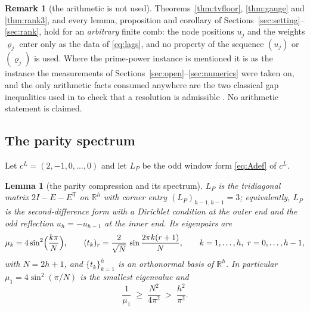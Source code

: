 \documentclass[11pt,a4paper]{article}
\theoremstyle{plain}
\newtheorem{lemma}[theorem]{Lemma}
\theoremstyle{definition}
\newtheorem{remark}[theorem]{Remark}
\newcommand{\R}{\mathbb{R}}
\newcommand{\T}{\mathsf{T}}
\begin{document}
\begin{remark}[the arithmetic is not used]
\label{rem:combfree}
Theorems~\ref{thm:tvfloor}, \ref{thm:gauge} and \ref{thm:rank3}, and every
lemma, proposition and corollary of Sections~\ref{sec:setting}--\ref{sec:rank},
hold for an \emph{arbitrary} finite comb: the node positions $u_j$ and the
weights $\varrho_j$ enter only as the data of \eqref{eq:lags}, and no property of
the sequence $(u_j)$ or $(\varrho_j)$ is used. Where the prime-power instance is
mentioned it is as the instance the measurements of
Sections~\ref{sec:open}--\ref{sec:numerics} were taken on, and the only
arithmetic facts consumed anywhere are the two classical gap inequalities used
in \cite{PaperI} to check that a resolution is admissible
\cite{Chebyshev1852,RosserSchoenfeld1962}. No arithmetic statement is claimed.
\end{remark}

\subsection{The parity spectrum}
\label{sec:parity}

Let $c^{L}=(2,-1,0,\dots,0)$ and let $L_P$ be the odd window form
\eqref{eq:Adef} of $c^{L}$.

\begin{lemma}[the parity compression and its spectrum]
\label{lem:kms}
$L_P$ is the tridiagonal matrix $2I-E-E^{\T}$ on $\R^{h}$ with corner entry
$(L_P)_{h-1,h-1}=3$; equivalently, $L_P$ is the second-difference form with a
Dirichlet condition at the outer end and the odd reflection $u_h=-u_{h-1}$ at
the inner end. Its eigenpairs are
\begin{equation}
\label{eq:kms}
  \mu_k=4\sin^{2}\Bigl(\frac{k\pi}{N}\Bigr),
  \qquad
  (t_k)_r=\frac2{\sqrt N}\,\sin\frac{2\pi k(r+1)}{N},
  \qquad k=1,\dots,h,\ r=0,\dots,h-1,
\end{equation}
with $N=2h+1$, and $\{t_k\}_{k=1}^{h}$ is an orthonormal basis of $\R^{h}$. In
particular $\mu_1=4\sin^{2}(\pi/N)$ is the smallest eigenvalue and
\begin{equation}
\label{eq:gap}
  \frac1{\mu_1}\;\ge\;\frac{N^{2}}{4\pi^{2}}\;>\;\frac{h^{2}}{\pi^{2}} .
\end{equation}
\end{lemma}
\end{document}
